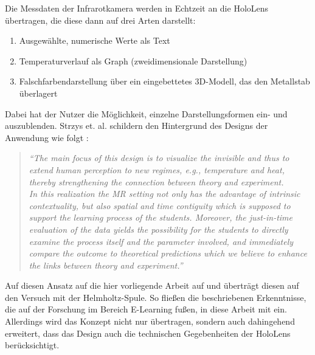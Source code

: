 Die Messdaten der Infrarotkamera werden in Echtzeit an die HoloLens übertragen, die diese dann auf drei Arten darstellt:
\begin{enumerate}
	\setlength{\itemsep}{-2pt}
	\item Ausgewählte, numerische Werte als Text
	\item Temperaturverlauf als Graph (zweidimensionale Darstellung)
	\item Falschfarbendarstellung über ein eingebettetes 3D-Modell, das den Metallstab überlagert
\end{enumerate}
Dabei hat der Nutzer die Möglichkeit, einzelne Darstellungsformen ein- und auszublenden. Strzys et. al. schildern den Hintergrund des Designs der Anwendung wie folgt \Cite{Strzys17}:
\begin{quote}
	\textit{``The main focus of this design is to visualize the invisible and thus to extend human perception to new regimes, e.g., temperature and heat, thereby strengthening the connection between theory and experiment.\\ 
		In this realization the MR setting not only has the advantage of intrinsic contextuality, but also spatial and time contiguity which is supposed to support the learning process of the students. Moreover, the just-in-time evaluation of the data yields the possibility for the students to directly examine the process itself and the parameter involved, and immediately compare the outcome to theoretical predictions which we believe to enhance the links between theory and experiment.''}
\end{quote}

Auf diesen Ansatz auf die hier vorliegende Arbeit auf und überträgt diesen auf den Versuch mit der Helmholtz-Spule. So fließen die beschriebenen Erkenntnisse, die auf der Forschung im Bereich E-Learning fußen, in diese Arbeit mit ein. Allerdings wird das Konzept nicht nur übertragen, sondern auch dahingehend erweitert, dass das Design auch die technischen Gegebenheiten der HoloLens berücksichtigt.\\ %

